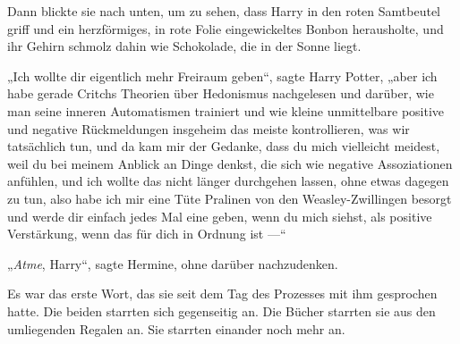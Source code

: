 Dann blickte sie nach unten, um zu sehen, dass Harry in den roten Samtbeutel griff und ein herzförmiges, in rote Folie eingewickeltes Bonbon herausholte, und ihr Gehirn schmolz dahin wie Schokolade, die in der Sonne liegt.

„Ich wollte dir eigentlich mehr Freiraum geben“, sagte Harry Potter, „aber ich habe gerade Critchs Theorien über Hedonismus nachgelesen und darüber, wie man seine inneren Automatismen trainiert und wie kleine unmittelbare positive und negative Rückmeldungen insgeheim das meiste kontrollieren, was wir tatsächlich tun, und da kam mir der Gedanke, dass du mich vielleicht meidest, weil du bei meinem Anblick an Dinge denkst, die sich wie negative Assoziationen anfühlen, und ich wollte das nicht länger durchgehen lassen, ohne etwas dagegen zu tun, also habe ich mir eine Tüte Pralinen von den Weasley-Zwillingen besorgt und werde dir einfach jedes Mal eine geben, wenn du mich siehst, als positive Verstärkung, wenn das für dich in Ordnung ist —“

„\emph{Atme}, Harry“, sagte Hermine, ohne darüber nachzudenken.




Es war das erste Wort, das sie seit dem Tag des Prozesses mit ihm gesprochen hatte. Die beiden starrten sich gegenseitig an. Die Bücher starrten sie aus den umliegenden Regalen an. Sie starrten einander noch mehr an.

